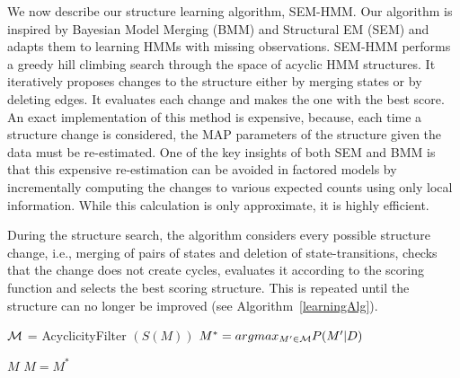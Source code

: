 \documentclass[letterpaper]{article}
\begin{document}
We now describe our structure learning algorithm, SEM-HMM.  Our algorithm is inspired by Bayesian Model Merging (BMM) \cite{stolcke1994best} and Structural EM (SEM) \cite{friedman1998bayesian} and adapts them to learning HMMs with missing observations.
SEM-HMM performs a greedy hill climbing search through the space of acyclic
HMM structures. It iteratively proposes changes to the structure either
by merging states or by deleting edges. It evaluates each change and makes the one with the best score.
An exact implementation of this method is expensive, because, each time a structure change is considered, the MAP parameters of the structure given the data must be re-estimated.
One of the key insights of both SEM and BMM is that this expensive
re-estimation can be avoided in factored models by incrementally
computing the changes to various expected counts using only local
information. While this calculation is only approximate, it is highly
efficient.


During the structure search, the algorithm considers every possible structure change, i.e., merging of pairs of states and deletion of state-transitions, checks that the change does not create cycles, evaluates it according to the scoring function and selects the best scoring structure. This is repeated until the structure can no longer be improved (see Algorithm~\ref{learningAlg}).

\begin{algorithm}
\footnotesize
\begin{algorithmic}

                        \State ${\cal M}$ = AcyclicityFilter $(S(M))$
			\State $M^* = argmax_{M^\prime \in {\cal M}} P(M^\prime|D)$

				\State \Return $M$
			\Else
				\State $M = M^*$
			\EndIf

		\EndWhile
	\EndProcedure
\end{algorithmic}
\caption{}
\label{learningAlg}
\end{algorithm}
\end{document}
